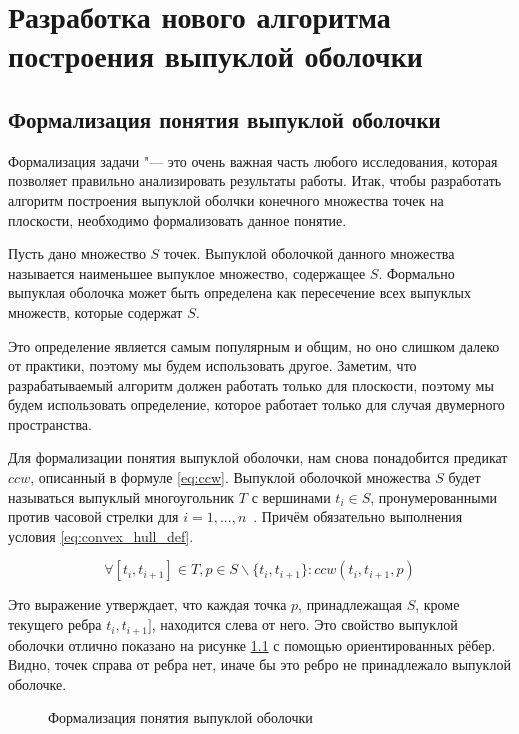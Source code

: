 \chapter{Разработка нового алгоритма построения выпуклой оболочки} \label{chapt2}

\section{Формализация понятия выпуклой оболочки} \label{sect2_1}

Формализация задачи "--- это очень важная часть любого исследования, которая позволяет правильно анализировать результаты работы. Итак, чтобы разработать алгоритм построения выпуклой оболчки конечного множества точек на плоскости, необходимо формализовать данное понятие.

Пусть дано множество $S$ точек. Выпуклой оболочкой данного множества называется наименьшее выпуклое множество, содержащее $S$. Формально выпуклая оболочка может быть определена как пересечение всех выпуклых множеств, которые содержат $S$.

Это определение является самым популярным и общим, но оно слишком далеко от практики, поэтому мы будем использовать другое. Заметим, что разрабатываемый алгоритм должен работать только для плоскости, поэтому мы будем использовать определение, которое работает только для случая двумерного пространства.

Для формализации понятия выпуклой оболочки, нам снова понадобится предикат $ccw$, описанный в формуле \eqref{eq:ccw}. Выпуклой оболочкой множества $S$ будет называться выпуклый многоугольник $T$ с вершинами $t_i \in S$, пронумерованными против часовой стрелки для $i = 1,...,n$~\cite{pichardie2001formalizing}. Причём обязательно выполнения условия \eqref{eq:convex_hull_def}.

\begin{equation}\label{eq:convex_hull_def}
\forall [t_i, t_{i+1}] \in T, p \in S \backslash \{ t_i, t_{i+1} \} : ccw(t_i, t_{i+1}, p)
\end{equation}

Это выражение утверждает, что каждая точка $p$, принадлежащая $S$, кроме текущего ребра $t_i, t_{i+1}]$, находится слева от него. Это свойство выпуклой оболочки отлично показано на рисунке \ref{img:convex_hull_def} с помощью ориентированных рёбер. Видно, точек справа от ребра нет, иначе бы это ребро не принадлежало выпуклой оболочке.

\begin{figure}[hbt]
	{\centering
		\hfill
		\hfill
		\hfill
	}
	\caption{Формализация понятия выпуклой оболочки}
	\label{img:convex_hull_def}
\end{figure}

